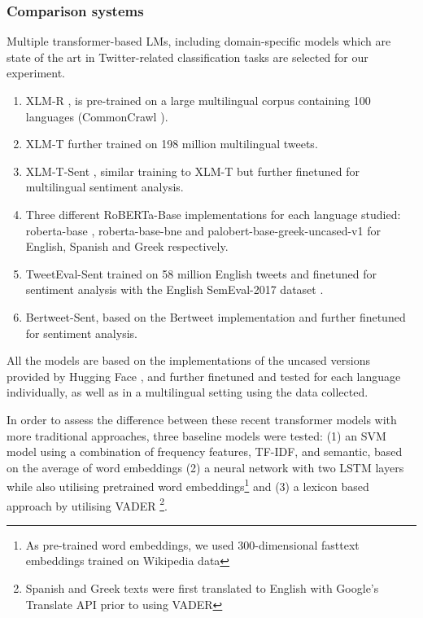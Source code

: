 \subsubsection{Comparison systems} Multiple transformer-based \acp{LM}, including domain-specific models which are state of the art in Twitter-related classification tasks \cite{barbieri2020tweeteval} are selected for our experiment.
\begin{enumerate}
    \item XLM-R \cite{conneau2019unsupervised}, is pre-trained on a large multilingual corpus containing 100 languages (CommonCrawl \cite{wenzek2020ccnet}).
    \item XLM-T \cite{barbieri2021xlm} further trained on 198 million multilingual tweets.
    \item XLM-T-Sent \cite{barbieri2021xlm}, similar training to XLM-T but further finetuned for multilingual sentiment analysis.
    \item Three different RoBERTa-Base implementations for each language studied: roberta-base \cite{ROBERTA},  roberta-base-bne \cite{gutierrezfandino2021spanish} and palobert-base-greek-uncased-v1 \cite{info12080331} for English, Spanish and Greek respectively.
    \item TweetEval-Sent \cite{barbieri2020tweeteval} trained on 58 million English tweets and finetuned for sentiment analysis with the English SemEval-2017 dataset \cite{rosenthal2017semeval}.
    \item Bertweet-Sent, based on the Bertweet \cite{bertweet} implementation and further finetuned for sentiment analysis.
\end{enumerate}

All the models are based on the implementations of the uncased versions provided by Hugging Face \cite{wolf-etal-2020-transformers}, and further finetuned and tested for each language individually, as well as in a multilingual setting using the data collected.

In order to assess the difference between these recent transformer models with more traditional approaches, three baseline models were tested: (1) an SVM model using a combination of frequency features, TF-IDF, and semantic, based on the average of word embeddings  (2) a neural network with two LSTM layers while also utilising pretrained word embeddings\footnote{As pre-trained word embeddings, we used 300-dimensional fasttext embeddings \cite{grave2018learning} trained on Wikipedia data} and (3) a lexicon based approach by utilising VADER \cite{hutto2014vader} \footnote{Spanish and Greek texts were first translated to English with Google's Translate \ac{API} prior to using VADER}.


